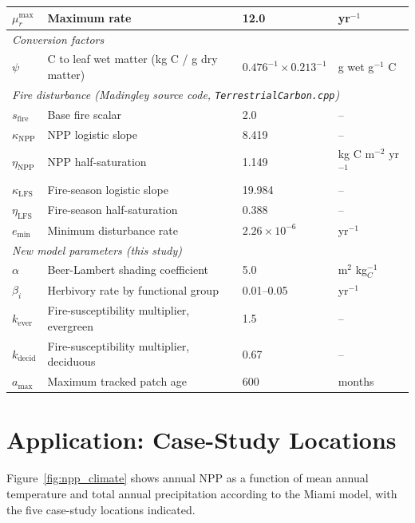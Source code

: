 \documentclass[12pt]{article}
\begin{document}
\begin{table}[ht]
\begin{tabular}{llll}
$\mu^{\max}_{r}$      & Maximum rate & 12.0 & yr$^{-1}$ \\
\midrule
\multicolumn{4}{l}{\textit{Conversion factors}} \\
$\psi$                & C to leaf wet matter (kg C / g dry matter) & $0.476^{-1}\times 0.213^{-1}$ & g wet g$^{-1}$ C \\
\midrule
\multicolumn{4}{l}{\textit{Fire disturbance (Madingley source code, \texttt{TerrestrialCarbon.cpp})}} \\
$s_{\mathrm{fire}}$        & Base fire scalar & 2.0 & -- \\
$\kappa_{\mathrm{NPP}}$    & NPP logistic slope & 8.419 & -- \\
$\eta_{\mathrm{NPP}}$      & NPP half-saturation & 1.149 & kg C m$^{-2}$ yr$^{-1}$ \\
$\kappa_{\mathrm{LFS}}$    & Fire-season logistic slope & 19.984 & -- \\
$\eta_{\mathrm{LFS}}$      & Fire-season half-saturation & 0.388 & -- \\
$e_{\min}$                 & Minimum disturbance rate & $2.26\times10^{-6}$ & yr$^{-1}$ \\
\midrule
\multicolumn{4}{l}{\textit{New model parameters (this study)}} \\
$\alpha$              & Beer-Lambert shading coefficient & 5.0 & m$^2$ kg$_C^{-1}$ \\
$\beta_i$             & Herbivory rate by functional group & 0.01--0.05 & yr$^{-1}$ \\
$k_{\mathrm{ever}}$   & Fire-susceptibility multiplier, evergreen & 1.5 & -- \\
$k_{\mathrm{decid}}$  & Fire-susceptibility multiplier, deciduous & 0.67 & -- \\
$a_{\max}$            & Maximum tracked patch age & 600 & months \\
\bottomrule
\end{tabular}
\end{table}

\section{Application: Case-Study Locations}

Figure~\ref{fig:npp_climate} shows annual NPP as a function of mean annual temperature
and total annual precipitation according to the Miami model, with the five case-study
locations indicated.
\end{document}

